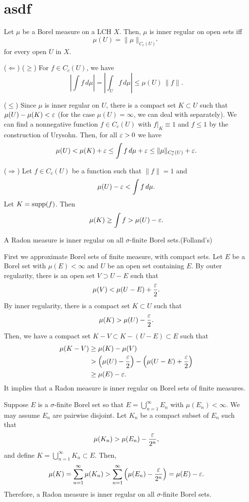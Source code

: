\documentclass{../../large}
\begin{document}

\section*{asdf}


\begin{lem}
Let $\mu$ be a Borel measure on a LCH $X$.
Then, $\mu$ is inner regular on open sets iff
\[\mu(U)=\|\mu\|_{C_c(U)^*}\]
for every open $U$ in $X$.
\end{lem}
\begin{pf}
($\Leftarrow$)
($\ge$)
For $f\in C_c(U)$, we have
\[|\int f\,d\mu|=|\int_Uf\,d\mu|\le\mu(U)\,\|f\|.\]

($\le$)
Since $\mu$ is inner regular on $U$, there is a compact set $K\subset U$ such that $\mu(U)-\mu(K)<\varepsilon$ (for the case $\mu(U)=\infty$, we can deal with separately).
We can find a nonnegative function $f\in C_c(U)$ with $f|_K \equiv 1$ and $f\le1$ by the construction of Urysohn.
Then, for all $\varepsilon>0$ we have
\[\mu(U)<\mu(K)+\varepsilon\le\int f\,d\mu+\varepsilon\le\|\mu\|_{C_c^*(U)}+\varepsilon.\]

($\Rightarrow$)
Let $f\in C_c(U)$ be a function such that $\|f\|=1$ and
\[\mu(U)-\varepsilon<\int f\,d\mu.\]
Let $K=\operatorname{supp}(f)$.
Then
\[\mu(K)\ge\int f>\mu(U)-\varepsilon.\]
\end{pf}

\begin{prop}
A Radon measure is inner regular on all $\sigma$-finite Borel sets.(Folland's)
\end{prop}
\begin{pf}
First we approximate Borel sets of finite measure, with compact sets.
Let $E$ be a Borel set with $\mu(E)<\infty$ and $U$ be an open set containing $E$.
By outer regularity, there is an open set $V\supset U-E$ such that
\[\mu(V)<\mu(U-E)+\frac{\varepsilon}2.\]
By inner regularity, there is a compact set $K\subset U$ such that
\[\mu(K)>\mu(U)-\frac{\varepsilon}2.\]
Then, we have a compact set $K-V\subset K-(U-E)\subset E$ such that
\begin{align*}
\mu(K-V)&\ge\mu(K)-\mu(V)\\
&>\left(\mu(U)-\frac{\varepsilon}2\right)-\left(\mu(U-E)+\frac{\varepsilon}2\right)\\
&\ge\mu(E)-\varepsilon.
\end{align*}
It implies that a Radon measure is inner regular on Borel sets of finite measures.

Suppose $E$ is a $\sigma$-finite Borel set so that $E=\bigcup_{n=1}^\infty E_n$ with $\mu(E_n)<\infty$.
We may assume $E_n$ are pairwise disjoint.
Let $K_n$ be a compact subset of $E_n$ such that
\[\mu(K_n)>\mu(E_n)-\frac{\varepsilon}{2^n},\]
and define $K=\bigcup_{n=1}^\infty K_n\subset E$.
Then,
\[\mu(K)=\sum_{n=1}^\infty\mu(K_n)>\sum_{n=1}^\infty\left(\mu(E_n)-\frac{\varepsilon}{2^n}\right)=\mu(E)-\varepsilon.\]
Therefore, a Radon measure is inner regular on all $\sigma$-finite Borel sets.
\end{pf}
\end{document}
